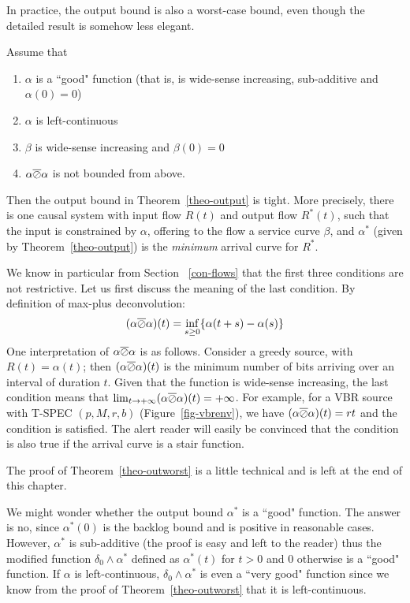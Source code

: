 In practice, the output bound is also a worst-case bound, even
though the detailed result is somehow less elegant.
\begin{theorem} 
Assume that
\begin{enumerate}
  \item $\alpha$ is a ``good" function (that is,
  is wide-sense increasing, sub-additive and $\alpha(0)=0$)
  \item $\alpha$ is left-continuous
  \item $\beta$ is wide-sense increasing and  $\beta(0)=0$
  \item $\alpha \overline{\oslash} \alpha $ is not bounded from above.
\end{enumerate}
Then the output bound in Theorem~\ref{theo-output} is tight.  More
precisely, there is one causal system with input flow $R(t)$ and
output flow $R^*(t)$, such that the input is constrained by
$\alpha$, offering to the flow a service curve $\beta$, and
$\alpha^*$ (given by Theorem~\ref{theo-output}) is the
\emph{minimum} arrival curve for $R^*$.
\end{theorem}
We know in particular from Section ~\ref{con-flows} that the first
three conditions are not restrictive. Let us first discuss the
meaning of the last condition. By definition of max-plus
deconvolution:
$$(\alpha \overline{\oslash} \alpha)(t)= \inf_{s \geq 0} \{\alpha (t+s) - \alpha(s)  \}
$$
One interpretation of $\alpha \overline{\oslash} \alpha$ is as follows. Consider
a greedy source, with $R(t)=\alpha(t)$; then $(\alpha \overline{\oslash}
\alpha)(t)$ is the minimum number of bits arriving over an
interval of duration $t$. Given that the function is wide-sense
increasing, the last condition means that $\lim_{t \rightarrow +
\infty}(\alpha \overline{\oslash} \alpha)(t) = + \infty$. For example, for a VBR
source with T-SPEC $(p,M,r,b)$ (Figure~\ref{fig-vbrenv}), we have
$(\alpha \overline{\oslash} \alpha)(t)= rt$ and the condition is satisfied. The
alert reader will easily be convinced that the condition is also
true if the arrival curve is a stair function.

The proof of Theorem~\ref{theo-outworst} is a little technical and
is left at the end of this chapter.


We might wonder whether the output bound $\alpha^*$ is a ``good"
function. The answer is no, since $\alpha^*(0)$ is the backlog
bound and is positive in reasonable cases. However, $\alpha^*$ is
sub-additive (the proof is easy and left to the reader) thus the
modified function $\delta_0 \wedge \alpha^*$ defined as
$\alpha^*(t)$ for $t
>0$ and $0$ otherwise is a ``good" function. If $\alpha$ is
left-continuous, $\delta_0 \wedge \alpha^*$ is even a ``very good"
function since we know from the proof of
Theorem~\ref{theo-outworst} that it is left-continuous.


